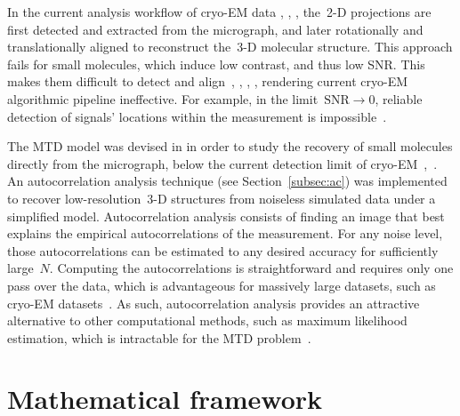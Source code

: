 \documentclass{article}
\begin{document}
In the current analysis workflow of \mbox{cryo-EM} data \cite{bendory2020single}, \cite{scheres2012relion}, \cite{punjani2017cryosparc}, the~\mbox{2-D} projections are first detected and extracted from the micrograph, and later rotationally and translationally aligned to reconstruct the~\mbox{3-D} molecular structure. This approach fails for small molecules, which induce low contrast, and thus low SNR. This makes them difficult to detect and align~\cite{bendory2018toward}, \cite{henderson1995potential}, \cite{bendory2020single}, \cite{aguerrebere2016fundamental}, rendering current \mbox{cryo-EM} algorithmic pipeline ineffective. For example, in the limit~\mbox{$\text{SNR} \rightarrow 0$}, reliable detection of signals' locations within the measurement is impossible~\cite[Proposition~3.1]{bendory2018toward}.

The MTD model was devised in \cite{bendory2018toward} in order to study the recovery of small molecules directly from the micrograph, below the current detection limit of \mbox{cryo-EM}~\cite{henderson1995potential},~\cite{d2021current}. An autocorrelation analysis technique (see Section~\ref{subsec:ac}) was implemented to recover \mbox{low-resolution}~\mbox{3-D} structures from noiseless simulated data under a simplified model. Autocorrelation analysis consists of finding an image that best explains the empirical autocorrelations of the measurement. For any noise level, those autocorrelations can be estimated to any desired accuracy for sufficiently large~$N$. Computing the autocorrelations is straightforward and requires only one pass over the data, which is advantageous for massively large datasets, such as \mbox{cryo-EM} datasets~\cite{bendory2020single}. As such, autocorrelation analysis provides an attractive alternative to other computational methods, such as maximum likelihood estimation, which is intractable for the MTD problem~\cite{lan2020multi}.

\section{Mathematical framework}
\label{sec:math}
\end{document}
